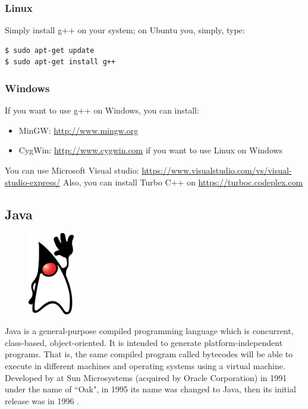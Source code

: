 \documentclass{KodeBook}
\begin{document}
\subsubsection{Linux}
Simply install g++ on your system; on Ubuntu you, simply, type:
\begin{lstlisting}[style=shellStyle]
$ sudo apt-get update
$ sudo apt-get install g++
\end{lstlisting}

\subsubsection{Windows}

If you want to use g++ on Windows, you can install:
\begin{itemize}
	\item MinGW: \url{http://www.mingw.org} 
	\item CygWin: \url{http://www.cygwin.com} if you want to use Linux on Windows
\end{itemize}

You can use Microsoft Visual studio: \url{https://www.visualstudio.com/vs/visual-studio-express/}
Also, you can install Turbo C++ on \url{https://turboc.codeplex.com}

\subsection{Java}

\begin{figure}
	\centering
	\vspace{-20pt}
	\includegraphics[width=2cm]{../img/Java.pdf}
	\vspace{-30pt}
\end{figure}

Java is a general-purpose compiled programming language which is concurrent, class-based, object-oriented. 
It is intended to generate platform-independent programs. 
That is, the same compiled program called bytecodes will be able to execute in different machines and operating systems using a virtual machine. 
Developed by  at Sun Microsystems (acquired by Oracle Corporation) in 1991 under the name of ``Oak", in 1995 its name was changed to Java, then its initial release was in 1996 \citep{2014-panigraphy}.
\end{document}
